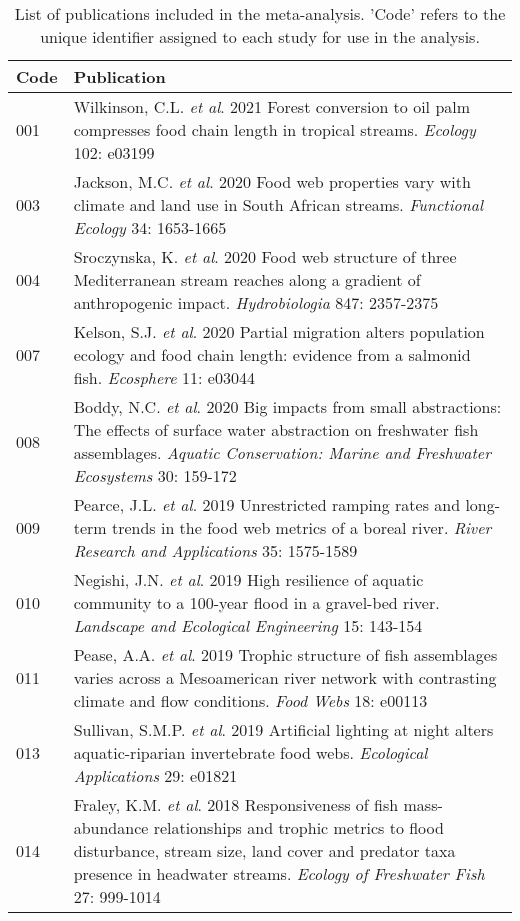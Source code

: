 \begingroup\small
\begin{longtable}{p{}p{}}
\caption{List of publications included in the meta-analysis.
             'Code' refers to the unique identifier assigned to each study for use in the analysis.
             \label{tab:meta-list}} \\ 
  \hline
Code & Publication \\ 
  \hline
001 & Wilkinson, C.L. \textit{et al}. 2021 Forest conversion to oil palm compresses food chain length in tropical streams. \textit{Ecology} 102: e03199 \\ 
  003 & Jackson, M.C. \textit{et al}. 2020 Food web properties vary with climate and land use in South African streams. \textit{Functional Ecology} 34: 1653-1665 \\ 
  004 & Sroczynska, K. \textit{et al}. 2020 Food web structure of three Mediterranean stream reaches along a gradient of anthropogenic impact. \textit{Hydrobiologia} 847: 2357-2375 \\ 
  007 & Kelson, S.J. \textit{et al}. 2020 Partial migration alters population ecology and food chain length: evidence from a salmonid fish. \textit{Ecosphere} 11: e03044 \\ 
  008 & Boddy, N.C. \textit{et al}. 2020 Big impacts from small abstractions: The effects of surface water abstraction on freshwater fish assemblages. \textit{Aquatic Conservation: Marine and Freshwater Ecosystems} 30: 159-172 \\ 
  009 & Pearce, J.L. \textit{et al}. 2019 Unrestricted ramping rates and long-term trends in the food web metrics of a boreal river. \textit{River Research and Applications} 35: 1575-1589 \\ 
  010 & Negishi, J.N. \textit{et al}. 2019 High resilience of aquatic community to a 100-year flood in a gravel-bed river. \textit{Landscape and Ecological Engineering} 15: 143-154 \\ 
  011 & Pease, A.A. \textit{et al}. 2019 Trophic structure of fish assemblages varies across a Mesoamerican river network with contrasting climate and flow conditions. \textit{Food Webs} 18: e00113 \\ 
  013 & Sullivan, S.M.P. \textit{et al}. 2019 Artificial lighting at night alters aquatic-riparian invertebrate food webs. \textit{Ecological Applications} 29: e01821 \\ 
  014 & Fraley, K.M. \textit{et al}. 2018 Responsiveness of fish mass-abundance relationships and trophic metrics to flood disturbance, stream size, land cover and predator taxa presence in headwater streams. \textit{Ecology of Freshwater Fish} 27: 999-1014 \\ 

\end{longtable}
